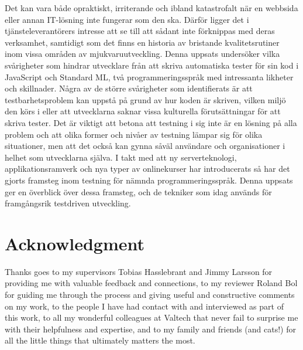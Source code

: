 Det kan vara både opraktiskt, irriterande och ibland katastrofalt när en webbsida eller annan IT-lösning inte fungerar som den ska. Därför ligger det i tjänsteleverantörers intresse att se till att sådant inte förknippas med deras verksamhet, samtidigt som det finns en historia av bristande kvalitetsrutiner inom vissa områden av mjukvaruutveckling. Denna uppsats undersöker vilka svårigheter som hindrar utvecklare från att skriva automatiska tester för sin kod i JavaScript och Standard ML, två programmeringsspråk med intressanta likheter och skillnader. Några av de större svårigheter som identifierats är att testbarhetsproblem kan uppstå på grund av hur koden är skriven, vilken miljö den körs i eller att utvecklarna saknar vissa kulturella förutsättningar för att skriva tester. Det är viktigt att betona att testning i sig inte är en lösning på alla problem och att olika former och nivåer av testning lämpar sig för olika situationer, men att det också kan gynna såväl användare och organisationer i helhet som utvecklarna själva. I takt med att ny serverteknologi, applikationsramverk och nya typer av onlinekurser har introducerats så har det gjorts framsteg inom testning för nämnda programmeringsspråk. Denna uppsats ger en överblick över dessa framsteg, och de tekniker som idag används för framgångsrik testdriven utveckling.

\newpage
\null
\newpage

\section*{Acknowledgment}

Thanks goes to my supervisors Tobias Hasslebrant and Jimmy Larsson for providing me with valuable feedback and connections, to my reviewer Roland Bol for guiding me through the process and giving useful and constructive comments on my work, to the people I have had contact with and interviewed as part of this work, to all my wonderful colleagues at Valtech that never fail to surprise me with their helpfulness and expertise, and to my family and friends (and cats!) for all the little things that ultimately matters the most.

\newpage
\null
\newpage

\tableofcontents

\newpage
\null
\newpage

